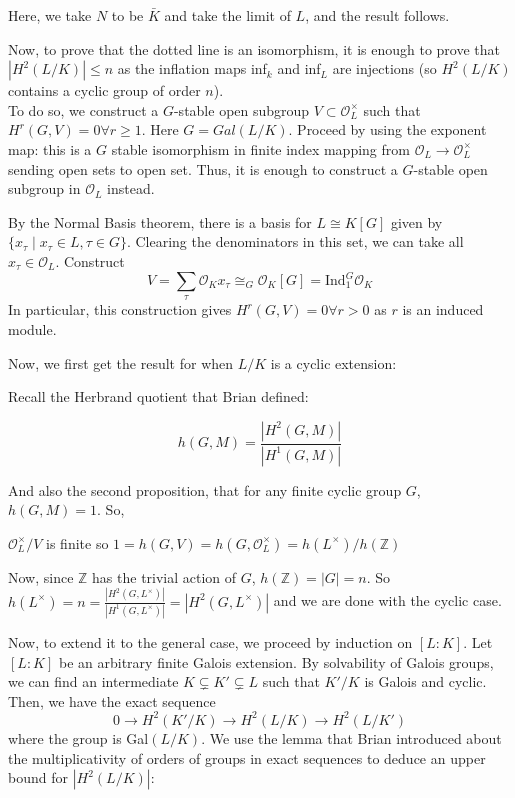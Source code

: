\documentclass[class=article, crop=false]{standalone}
\begin{document}
Here, we take $N$ to be $\bar{K}$ and take the limit of $L$, and the result follows. 

Now, to prove that the dotted line is an isomorphism, it is enough to prove that $|H^2(L/K)|\leq n$ as the inflation maps inf$_k$ and inf$_L$ are injections (so $H^2(L/K)$ contains a cyclic group of order $n$).\\

To do so, we construct a $G$-stable open subgroup $V\subset \mathcal{O}_L^\times$ such that $H^r(G, V)=0\forall r\geq 1$. Here $G=Gal(L/K).$ Proceed by using the exponent map: this is a $G$ stable isomorphism in finite index mapping from $\mathcal{O}_L\rightarrow\mathcal{O}_L^\times$ sending open sets to open set. Thus, it is enough to construct a $G$-stable open subgroup in $\mathcal{O}_L$ instead. 

By the Normal Basis theorem, there is a basis for $L\cong K[G]$ given by $\{x_\tau \mid x_\tau\in L, \tau\in G\}$. Clearing the denominators in this set, we can take all $x_\tau\in \mathcal{O}_L$. Construct $$V=\sum_\tau \mathcal{O}_Kx_\tau\cong_G\mathcal{O}_K[G]=\text{Ind}_1^G\mathcal{O}_K$$ 
In particular, this construction gives $H^r(G,V)=0\forall r>0$ as $r$ is an induced module. 

Now, we first get the result for when $L/K$ is a cyclic extension: 

Recall the Herbrand quotient that Brian defined:

$$h(G,M)=\frac{|H^2(G,M)|}{|H^1(G,M)|}$$

And also the second proposition, that for any finite cyclic group $G$, $h(G,M)=1$. So,

$\mathcal{O}_L^\times/V$ is finite so $1=h(G, V)=h(G, \mathcal{O}_L^\times)=h(L^\times)/h(\mathbb{Z})$

Now, since $\mathbb{Z}$ has the trivial action of $G$, $h(\mathbb{Z})=|G|=n$. So $h(L^\times)=n=\frac{|H^2(G,L^\times)|}{|H^1(G,L^\times)|}=|H^2(G,L^\times)|$ and we are done with the cyclic case. 

Now, to extend it to the general case, we proceed by induction on $[L:K]$. Let $[L:K]$ be an arbitrary finite Galois extension. By solvability of Galois groups, we can find an intermediate $K\subsetneq K'\subsetneq L$ such that $K'/K$ is Galois and cyclic. Then, we have the exact sequence $$0\rightarrow H^2(K'/K)\rightarrow H^2(L/K)\rightarrow H^2(L/K')$$ where the group is Gal$(L/K)$. We use the lemma that Brian introduced about the multiplicativity of orders of groups in exact sequences to deduce an upper bound for $|H^2(L/K)|:$
\end{document}
